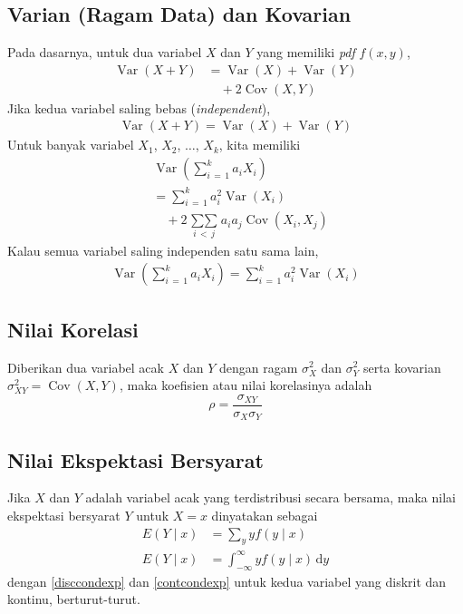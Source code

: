 \documentclass[extrafontsizes, 9pt]{memoir}
\DeclareMathOperator{\Cov}{Cov}
\DeclareMathOperator{\Var}{Var}
\begin{document}
\begin{multicols}{3}
			\subsection*{\small Varian (Ragam Data) dan Kovarian}
				Pada dasarnya, untuk dua variabel $X$ dan $Y$ yang memiliki \textsl{pdf} $f(x, y)$,
					\begin{align*}
						\Var(X + Y) & = \Var(X) + \Var(Y)\\
						& \quad + 2\Cov(X, Y)
					\end{align*}
				Jika kedua variabel saling bebas (\textsl{independent}),
					\begin{align*}
						\Var(X + Y) = \Var(X) + \Var(Y)
					\end{align*}
				Untuk banyak variabel $X_{1}$, $X_{2}$, $\ldots$, $X_{k}$, kita memiliki
					\begin{align*}
						& \Var\left(\sum_{i\, = \, 1}^{k}a_{i}X_{i}\right)\\
						& = \sum_{i\, = \, 1}^{k}a_{i}^{2}\Var\left(X_{i}\right)\\
						& \quad + 2 \mathop{\sum\sum}\limits_{i\, < \, j}a_{i}a_{j}\Cov(X_{i}, X_{j})
					\end{align*}
				Kalau semua variabel saling independen satu sama lain,
					\begin{align*}
						\Var\left(\sum_{i\, = \, 1}^{k}a_{i}X_{i}\right) = \sum_{i\, = \, 1}^{k}a_{i}^{2}\Var\left(X_{i}\right)
					\end{align*}
					
			\subsection*{\small Nilai Korelasi}
				Diberikan dua variabel acak $X$ dan $Y$ dengan ragam $\sigma_{X}^{2}$ dan $\sigma_{Y}^{2}$ serta kovarian $\sigma_{XY}^{2} = \Cov(X, Y)$, maka koefisien atau nilai korelasinya adalah
					\[
						\rho = \dfrac{\sigma_{XY}}{\sigma_{X}\sigma_{Y}}
					\] 
					
			\subsection*{\small Nilai Ekspektasi Bersyarat}
				Jika $X$ dan $Y$ adalah variabel acak yang terdistribusi secara bersama, maka nilai ekspektasi bersyarat $Y$ untuk $X = x$ dinyatakan sebagai
					\begin{align}
						E(Y \mid x) & = \sum_{y}yf(y\mid x) \label{disccondexp}\\
						E(Y \mid x) & = \int_{-\infty}^{\infty}yf(y \mid x)\, \mathrm{d}y \label{contcondexp}
					\end{align}
				dengan \eqref{disccondexp} dan \eqref{contcondexp} untuk kedua variabel yang diskrit dan kontinu, berturut-turut.
				

\end{multicols}
\end{document}
